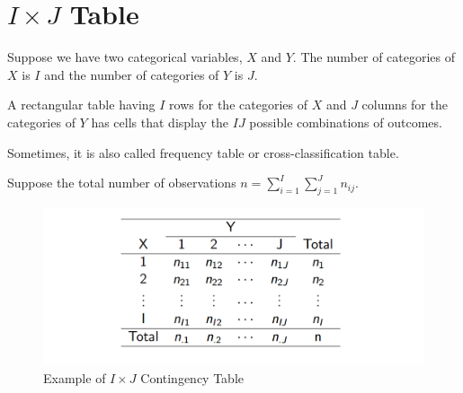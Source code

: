 \section{$I \times J$ Table}
Suppose we have two categorical variables, $X$ and $Y$. The number of categories of $X$ is $I$ and the number of categories of $Y$ is $J$.

\begin{definition}
	A rectangular table having $I$ rows for the categories of $X$ and $J$
	columns for the categories of $Y$ has cells that display the $IJ$ possible
combinations of outcomes.
	
	Sometimes, it is also called frequency table or cross-classification table.
\end{definition}

Suppose the total number of observations $n = \sum_{i = 1}^{I} \sum_{j =1}^{J}n_{ij}$. 
\begin{figure}[H]
	\centering
	\includegraphics[width=0.7\linewidth]{fig/screenshot001}
	\caption{Example of $I \times J$ Contingency Table}
	\label{fig:screenshot001}
\end{figure}
